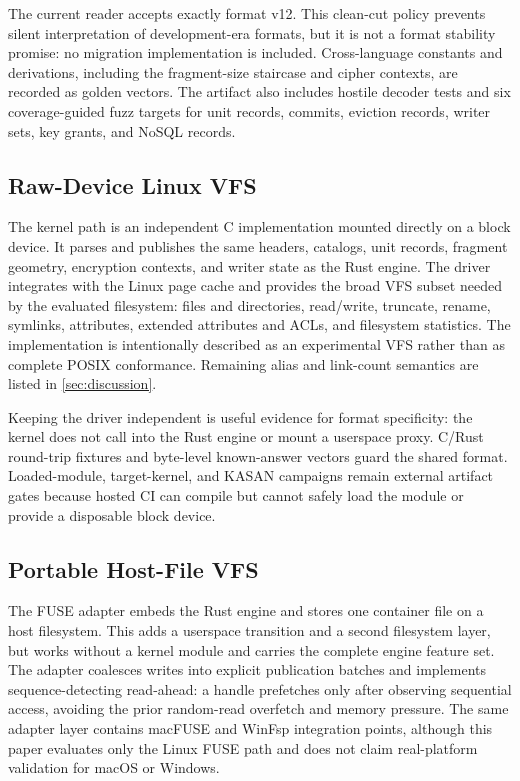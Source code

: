 The current reader accepts exactly format v12.  This clean-cut policy prevents
silent interpretation of development-era formats, but it is not a format
stability promise: no migration implementation is included.  Cross-language
constants and derivations, including the fragment-size staircase and cipher
contexts, are recorded as golden vectors.  The artifact also includes hostile
decoder tests and six coverage-guided fuzz targets for unit records, commits,
eviction records, writer sets, key grants, and NoSQL records.

\subsection{Raw-Device Linux VFS}

The kernel path is an independent C implementation mounted directly on a block
device.  It parses and publishes the same headers, catalogs, unit records,
fragment geometry, encryption contexts, and writer state as the Rust engine.
The driver integrates with the Linux page cache and provides the broad VFS
subset needed by the evaluated filesystem: files and directories, read/write,
truncate, rename, symlinks, attributes, extended attributes and ACLs, and
filesystem statistics.  The implementation is intentionally described as an
experimental VFS rather than as complete POSIX conformance.  Remaining alias and
link-count semantics are listed in \cref{sec:discussion}.

Keeping the driver independent is useful evidence for format specificity: the
kernel does not call into the Rust engine or mount a userspace proxy.  C/Rust
round-trip fixtures and byte-level known-answer vectors guard the shared
format.  Loaded-module, target-kernel, and KASAN campaigns remain external
artifact gates because hosted CI can compile but cannot safely load the module
or provide a disposable block device.

\subsection{Portable Host-File VFS}

The FUSE adapter embeds the Rust engine and stores one container file on a host
filesystem.  This adds a userspace transition and a second filesystem layer,
but works without a kernel module and carries the complete engine feature set.
The adapter coalesces writes into explicit publication batches and implements
sequence-detecting read-ahead: a handle prefetches only after observing
sequential access, avoiding the prior random-read overfetch and memory pressure.
The same adapter layer contains macFUSE and WinFsp integration points, although
this paper evaluates only the Linux FUSE path and does not claim real-platform
validation for macOS or Windows.

